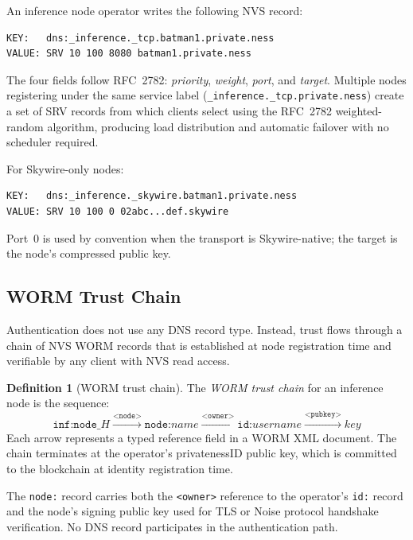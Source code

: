 \documentclass[11pt,a4paper]{article}
\theoremstyle{definition}
\newtheorem{definition}{Definition}[section]
\begin{document}
An inference node operator writes the following NVS record:

\begin{lstlisting}[caption={SRV record for TCP inference endpoint.}]
KEY:   dns:_inference._tcp.batman1.private.ness
VALUE: SRV 10 100 8080 batman1.private.ness
\end{lstlisting}

The four fields follow RFC~2782: \emph{priority}, \emph{weight}, \emph{port},
and \emph{target}.  Multiple nodes registering under the same service label
(\texttt{\_inference.\_tcp.private.ness}) create a set of SRV records from
which clients select using the RFC~2782 weighted-random algorithm, producing
load distribution and automatic failover with no scheduler required.

For Skywire-only nodes:
\begin{lstlisting}[caption={SRV record for Skywire inference endpoint.}]
KEY:   dns:_inference._skywire.batman1.private.ness
VALUE: SRV 10 100 0 02abc...def.skywire
\end{lstlisting}

Port~0 is used by convention when the transport is Skywire-native; the target
is the node's compressed public key.

\subsection{WORM Trust Chain}

Authentication does not use any DNS record type.  Instead, trust flows
through a chain of NVS WORM records that is established at node registration
time and verifiable by any client with NVS read access.

\begin{definition}[WORM trust chain]
The \emph{WORM trust chain} for an inference node is the sequence:
\[
\texttt{inf:node\_}\mathit{H} \xrightarrow{\texttt{<node>}} \texttt{node:}\mathit{name}
  \xrightarrow{\texttt{<owner>}} \texttt{id:}\mathit{username}
  \xrightarrow{\texttt{<pubkey>}} \mathit{key}
\]
Each arrow represents a typed reference field in a WORM XML document.
The chain terminates at the operator's privatenessID public key, which is
committed to the blockchain at identity registration time.
\end{definition}

The \texttt{node:} record carries both the \texttt{<owner>} reference to the
operator's \texttt{id:} record and the node's signing public key used for
TLS or Noise protocol handshake verification.  No DNS record participates
in the authentication path.
\end{document}
